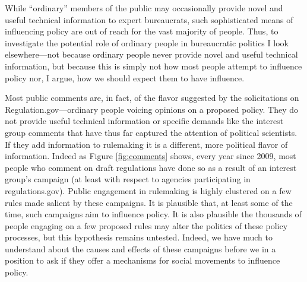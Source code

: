 %  

While ``ordinary'' members of the public may occasionally provide novel and useful technical information to expert bureaucrats, such sophisticated means of influencing policy are out of reach for the vast majority of people. Thus, to investigate the potential role of ordinary people in bureaucratic politics I look elsewhere---not because ordinary people never provide novel and useful technical information, but because this is simply not how most people attempt to influence policy nor, I argue, how we should expect them to have influence.

Most public comments are, in fact, of the flavor suggested by the solicitations on Regulation.gov---ordinary people voicing opinions on a proposed policy. They do not provide useful technical information or specific demands like the interest group comments that have thus far captured the attention of political scientists. If they add information to rulemaking it is a different, more political flavor of information. Indeed as Figure \ref{fig:comments} shows, every year since 2009, most people who comment on draft regulations have done so as a result of an interest group's campaign (at least with respect to agencies participating in regulations.gov). Public engagement in rulemaking is highly clustered on a few rules made salient by these campaigns. It is plausible that, at least some of the time, such campaigns aim to influence policy. It is also plausible the thousands of people engaging on a few proposed rules may alter the politics of these policy processes, but this hypothesis remains untested. Indeed, we have much to understand about the causes and effects of these campaigns before we in a position to ask if they offer a mechanisms for social movements to influence policy.

